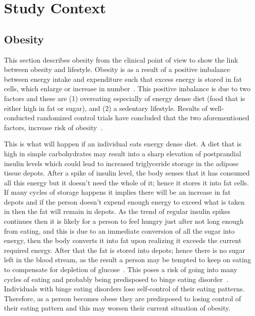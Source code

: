 
\chapter{Study Context} %

\label{contextchapter} %


\section{Obesity}
This section describes obesity from the clinical point of view to show the link between obesity and lifestyle. Obesity is as a  result of a positive imbalance between energy intake and expenditure such that excess energy is stored in fat cells, which enlarge or increase in number~\citep{steyn2006chronic}. This positive imbalance is due to two factors and these are (1) overeating especially of energy dense diet (food that is either high in fat or sugar), and (2) a sedentary lifestyle. Results of well-conducted randomized control trials have concluded that the two aforementioned factors, increase risk of obesity~\citep{swinburn2004diet}.

This is what will happen if an individual eats energy dense diet. A diet that is high in simple carbohydrates may result into a sharp elevation  of postprandial insulin levels which could lead to increased triglyceride storage in the adipose tissue depots. After a spike of insulin level, the body senses that it has consumed all this energy but it doesn't need the whole of it; hence it stores it into fat cells. If many cycles of storage happens it implies there will be an increase in fat depots and if the person doesn't expend enough energy to exceed what is taken in then the fat will remain in depots. As the trend of regular insulin spikes continues then it is likely for a person to feel hungry just after not long enough from eating, and this is due to an immediate conversion of all the sugar into energy, then the body converts it into fat upon realizing it exceeds the current required energy. After that the fat is stored into depots; hence there is no sugar left in the blood stream, as the result a person may be tempted to keep on eating to compensate for depletion of glucose~\citep{bouchard1993exercise}. This poses a risk of going into many cycles of eating and probably being predisposed to binge eating disorder~\citep{collins2009behavioral}. Individuals with binge eating disorders lose self-control of their eating patterns. Therefore, as a person becomes obese they are predisposed to losing control of their eating pattern and this may worsen their current situation of obesity. 

